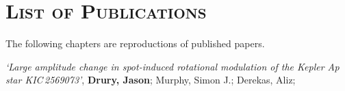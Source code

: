 \chapter*{\textsc{List of Publications}}

The following chapters are reproductions of published papers.

\vspace{0.7cm}

 {\it `Large amplitude change in spot-induced rotational modulation of the Kepler Ap star KIC\,2569073'}, {\bf Drury, Jason}; Murphy, Simon J.; Derekas, Aliz; 
\vspace{0.4cm}


\vspace{0.7cm}


\vspace{0.7cm}


\vspace{0.4cm}

